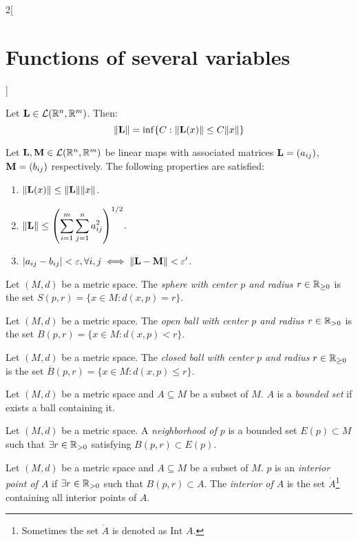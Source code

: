 \documentclass[../../../main.tex]{subfiles}
\begin{document}
\begin{multicols}{2}[\section{Functions of several variables}]
\begin{lemma}
  \end{lemma}
  \begin{prop}
    Let $\boldsymbol{\mathrm{L}}\in\mathcal{L}(\mathbb{R}^n,\mathbb{R}^m)$. Then: $$\|\boldsymbol{\mathrm{L}}\|=\inf\{C:\|\boldsymbol{\mathrm{L}}(x)\|\leq C\|x\|\}$$
  \end{prop}
  \begin{corollary}
    Let $\boldsymbol{\mathrm{L}},\boldsymbol{\mathrm{M}}\in\mathcal{L}(\mathbb{R}^n,\mathbb{R}^m)$ be linear maps with associated matrices $\boldsymbol{\mathrm{L}}=(a_{ij})$, $\boldsymbol{\mathrm{M}}=(b_{ij})$ respectively. The following properties are satisfied:
    \begin{enumerate}
      \item $\|\boldsymbol{\mathrm{L}}(x)\|\leq\|\boldsymbol{\mathrm{L}}\|\|x\|$.
      \item $\displaystyle\|\boldsymbol{\mathrm{L}}\|\leq\left(\sum_{i=1}^m\sum_{j=1}^na_{ij}^2\right)^{1/2}$.
      \item $|a_{ij}-b_{ij}|<\varepsilon,\forall i,j\iff\|\boldsymbol{\mathrm{L}}-\boldsymbol{\mathrm{M}}\|<\varepsilon'$.
    \end{enumerate}
  \end{corollary}
  \begin{definition}
    Let $(M,d)$ be a metric space. The \textit{sphere with center $p$ and radius $r\in\mathbb{R}_{\geq 0}$} is the set $S(p,r)=\{x\in M:d(x,p)=r\}$.
  \end{definition}
  \begin{definition}
    Let $(M,d)$ be a metric space. The \textit{open ball with center $p$ and radius $r\in\mathbb{R}_{>0}$} is the set $B(p,r)=\{x\in M:d(x,p)<r\}$.
  \end{definition}
  \begin{definition}
    Let $(M,d)$ be a metric space. The \textit{closed ball with center $p$ and radius $r\in\mathbb{R}_{\geq 0}$} is the set $\overline{B}(p,r)=\{x\in M:d(x,p)\leq r\}$.
  \end{definition}
  \begin{definition}
    Let $(M,d)$ be a metric space and $A\subseteq M$ be a subset of $M$. $A$ is a \textit{bounded set} if exists a ball containing it.
  \end{definition}
  \begin{definition}
    Let $(M,d)$ be a metric space. A \textit{neighborhood of $p$} is a bounded set $E(p)\subset M$ such that $\exists r\in\mathbb{R}_{>0}$ satisfying $B(p,r)\subset E(p)$.
  \end{definition}
  \begin{definition}
    Let $(M,d)$ be a metric space and $A\subseteq M$ be a subset of $M$. $p$ is an \textit{interior point of $A$} if $\exists r\in\mathbb{R}_{>0}$ such that $B(p,r)\subset A$. The \textit{interior of $A$} is the set $\mathring A$\footnote{Sometimes the set $\mathring A$ is denoted as $\text{Int }A$.} containing all interior points of $A$.

\end{definition}
\end{multicols}
\end{document}
